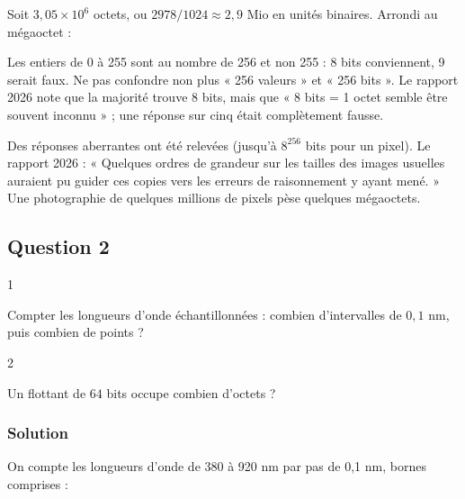 \documentclass[11pt,a4paper]{article}
\newcommand{\equationajustee}[1]{%
  \sbox{\boiteequation}{$\displaystyle #1$}%
  \ifdim\wd\boiteequation>\linewidth
    \[\resizebox{\linewidth}{!}{\usebox{\boiteequation}}\]%
  \else
    \[#1\]%
  \fi}
\begin{document}
Soit \(3{,}05 \times 10^6\) octets, ou \(2978/1024 \approx 2{,}9\) Mio en unités binaires. Arrondi au mégaoctet :

\equationajustee{\boxed{\text{environ } 3 \text{ Mo}}}

\begin{piege}

Les entiers de 0 à 255 sont au nombre de 256 et non 255 : 8 bits conviennent, 9 serait faux. Ne pas confondre non plus « 256 valeurs » et « 256 bits ». Le rapport 2026 note que la majorité trouve 8 bits, mais que « 8 bits = 1 octet semble être souvent inconnu » ; une réponse sur cinq était complètement fausse.

\end{piege}

\begin{jury}

Des réponses aberrantes ont été relevées (jusqu'à \(8^{256}\) bits pour un pixel). Le rapport 2026 : « Quelques ordres de grandeur sur les tailles des images usuelles auraient pu guider ces copies vers les erreurs de raisonnement y ayant mené. » Une photographie de quelques millions de pixels pèse quelques mégaoctets.

\end{jury}

\hypertarget{question-2}{%
\subsection{Question 2}\label{question-2}}

\begin{indication}{1}

Compter les longueurs d'onde échantillonnées : combien d'intervalles de \(0{,}1\) nm, puis combien de points ?

\end{indication}

\begin{indication}{2}

Un flottant de \(64\) bits occupe combien d'octets ?

\end{indication}

\hypertarget{solution-1}{%
\subsubsection{Solution}\label{solution-1}}

On compte les longueurs d'onde de 380 à 920 nm par pas de 0,1 nm, bornes comprises :
\end{document}
